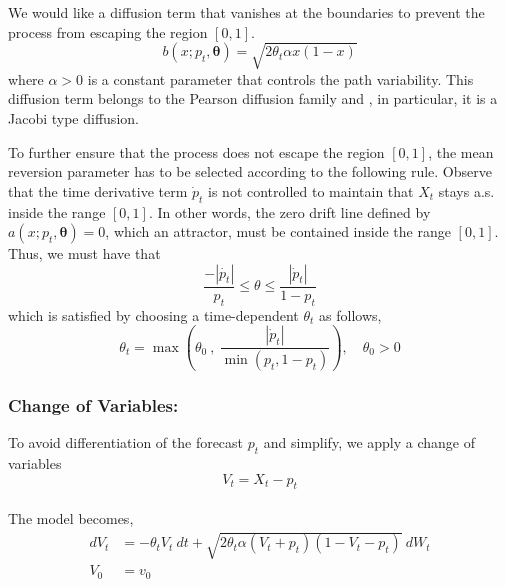\documentclass[10pt,twocolumn,letterpaper]{article}
\begin{document}
We would like  a diffusion term that vanishes at the boundaries to prevent the process from escaping the region $[0,1]$.
  \begin{equation}
    b (x; p_t,\bm{\theta} )= \sqrt{2 \theta_t \alpha x (1-x)}
  \end{equation}
  where $\alpha >0$ is a constant parameter that controls the path variability. This diffusion term belongs to the Pearson diffusion family and , in particular, it is a Jacobi type diffusion.

To further ensure that the process does not escape the region $[0,1]$, the mean reversion parameter has to be selected according to the following rule. Observe that the time derivative term $\dot{p}_t $ is not controlled to maintain that $X_t$ stays a.s.  inside the range $[0,1]$. In other words, the zero drift line defined by $a(x; p_t,\bm{\theta}) =0$, which an attractor, must be contained inside the range $[0,1]$. Thus, we must have that
\begin{equation}
\frac{- |\dot{p_t}|}{p_t} \leq \theta \leq \frac{|\dot{p}_t|}{1- p_t}
\end{equation}
which is satisfied  by choosing a time-dependent  $\theta_t$ as follows,
\begin{equation}
\theta_t = \max \left( \theta_0 \ , \ \frac{|\dot{p}_t|}{\min (p_t, 1-p_t)}  \right ),  \quad \theta_0 >0 \label{theta_t}
\end{equation}

\subsubsection*{Change of Variables:}
To avoid differentiation of the forecast $p_t$ and simplify, we apply a change of variables $$V_t = X_t - p_t$$ \\
The  model becomes,
\begin{equation}
\begin{split}
dV_t &=  - \theta_t V_t \  dt + \sqrt{2 \theta_t \alpha (V_t +p_t ) (1-V_t-p_t)} \  dW_t  \\ %
V_0 & = v_0\\
\end{split}\label{VtSDE}
\end{equation}
\end{document}
